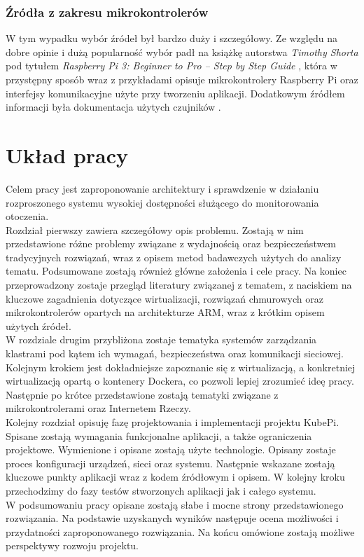 \documentclass[12pt]{report}
\let\Oldsection\section
\renewcommand{\section}{\FloatBarrier\Oldsection}
\let\Oldsubsubsection\subsubsection
\renewcommand{\subsubsection}{\FloatBarrier\Oldsubsubsection}
\begin{document}
\subsubsection{Źródła z zakresu mikrokontrolerów}
	\indent W tym wypadku wybór źródeł był bardzo duży i szczegółowy. Ze względu na dobre opinie i dużą popularność wybór padł na książkę autorstwa \textit{Timothy Shorta} pod tytułem \textit{Raspberry Pi 3: Beginner to Pro – Step by Step Guide} \cite{raspberry}, która w przystępny sposób wraz z przykładami opisuje mikrokontrolery Raspberry Pi oraz interfejsy komunikacyjne użyte przy tworzeniu aplikacji. Dodatkowym źródłem informacji była dokumentacja użytych czujników \cite{ds18b20Doc} \cite{max7219Doc} \cite{dht11Doc}  \cite{mq3Doc}.
	
\section{Układ pracy}
Celem pracy jest zaproponowanie architektury i sprawdzenie w działaniu rozproszonego systemu wysokiej dostępności służącego do monitorowania otoczenia. \\
\indent Rozdział pierwszy zawiera szczegółowy opis problemu. Zostają w nim przedstawione różne problemy związane z wydajnością oraz bezpieczeństwem tradycyjnych rozwiązań, wraz z opisem metod badawczych użytych do analizy tematu. Podsumowane zostają również główne założenia i cele pracy. Na koniec przeprowadzony zostaje przegląd literatury związanej z tematem, z naciskiem na kluczowe zagadnienia dotyczące wirtualizacji, rozwiązań chmurowych oraz mikrokontrolerów opartych na architekturze ARM, wraz z krótkim opisem użytych źródeł. \\
\indent W rozdziale drugim przybliżona zostaje tematyka systemów zarządzania klastrami pod kątem ich wymagań, bezpieczeństwa oraz komunikacji sieciowej. Kolejnym krokiem jest dokładniejsze zapoznanie się z wirtualizacją, a konkretniej wirtualizacją opartą o kontenery Dockera, co pozwoli lepiej zrozumieć ideę pracy. Następnie po krótce przedstawione zostają tematyki związane z mikrokontrolerami oraz Internetem Rzeczy. \\
\indent Kolejny rozdział opisuję fazę projektowania i implementacji projektu KubePi. Spisane zostają wymagania funkcjonalne aplikacji, a także ograniczenia projektowe. Wymienione i opisane zostają użyte technologie. Opisany zostaje proces konfiguracji urządzeń, sieci oraz systemu. Następnie wskazane zostają kluczowe punkty aplikacji wraz z kodem źródłowym i opisem. W kolejny kroku przechodzimy do fazy testów stworzonych aplikacji jak i całego systemu. \\
\indent W podsumowaniu pracy opisane zostają słabe i mocne strony przedstawionego rozwiązania. Na podstawie uzyskanych wyników następuje ocena możliwości i przydatności zaproponowanego rozwiązania. Na końcu omówione zostają możliwe perspektywy rozwoju projektu.
\end{document}
